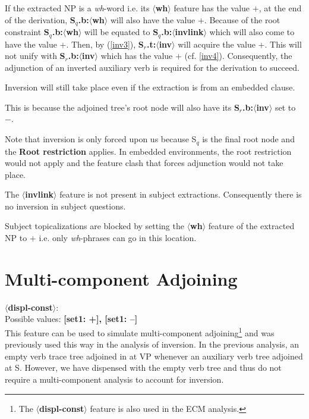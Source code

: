 If the extracted NP is a {\em wh}-word i.e. its {\bf $\langle$wh$\rangle$} 
feature has the value $+$, at the end of the derivation, 
{\bf S$_{q}$.b:$\langle$wh$\rangle$} will also have the value $+$. Because of
the root constraint {\bf S$_{q}$.b:$\langle$wh$\rangle$} will be equated 
to {\bf S$_{q}$.b:$\langle$invlink$\rangle$} which will also come to have
the value $+$. Then, by (\ref{inv3}), {\bf S$_{r}$.t:$\langle$inv$\rangle$} 
will acquire the value $+$. This will not unify with {\bf S$_{r}$.b:$\langle$inv$\rangle$}
which has the value $+$ (cf. \ref{inv4}). Consequently, the adjunction
of an inverted auxiliary verb is required for the derivation to succeed.

Inversion will still take place even if the extraction is from an embedded
clause.


This is because the adjoined tree's root node will also have its 
{\bf S$_{r}$.b:$\langle$inv$\rangle$} set to $-$. 


Note that inversion is only forced upon us because S$_{q}$ is the
final root node and the {\bf Root restriction} applies. In embedded
environments, the root restriction would not apply and the feature
clash that forces adjunction would not take place.

The {\bf $\langle$invlink$\rangle$} feature is not present in subject
extractions.  Consequently there is no inversion in subject questions.

Subject topicalizations are blocked by setting the 
{\bf $\langle$wh$\rangle$} feature of the extracted NP to $+$ i.e. only
{\em wh}-phrases can go in this location. 


\section{Multi-component Adjoining}

{\bf $\langle$displ-const$\rangle$}:\\ Possible values: {\bf [set1: +], [set1:
--]}\\ This feature can be used to simulate multi-component
adjoining\footnote{The {\bf $\langle$displ-const$\rangle$} feature is also used
in the ECM analysis.} and was previously used this way in the analysis of
inversion. In the previous analysis, an empty verb trace tree adjoined in
at VP whenever an auxiliary verb tree adjoined at S.
However, we have dispensed with the empty verb tree and thus do not require a
multi-component analysis to account for inversion.

